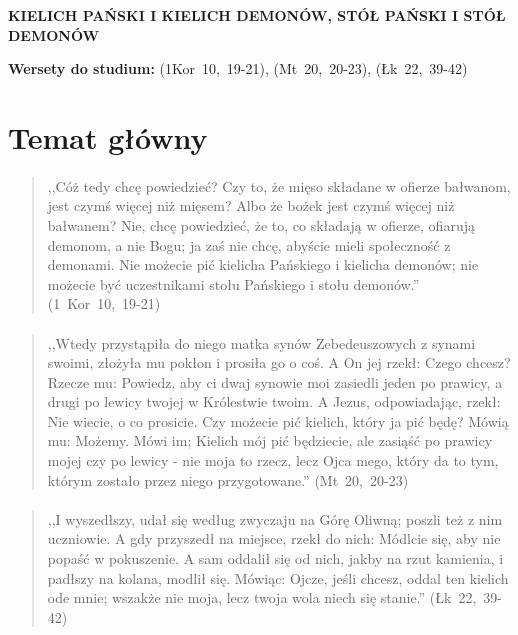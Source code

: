 \documentclass[10pt,a4paper,oneside]{article}
\begin{document}
\centerline{\textbf{\MakeUppercase{Kielich Pański i kielich demonów, stół Pański i stół demonów}}}
\begin{center}
\textbf{Wersety do studium:} 
\mbox{(1Kor 10, 19-21)}, \mbox{(Mt 20, 20-23)}, \mbox{(Łk 22, 39-42)}
\end{center}
\section{Temat główny}
\paragraph{}
\begin{quote}
,,Cóż tedy chcę powiedzieć? Czy to, że mięso składane w ofierze bałwanom, jest czymś więcej niż mięsem? Albo że bożek jest czymś więcej niż bałwanem? Nie, chcę powiedzieć, że to, co składają w ofierze, ofiarują demonom, a nie Bogu; ja zaś nie chcę, abyście mieli społeczność z demonami. Nie możecie pić kielicha Pańskiego i kielicha demonów; nie możecie być uczestnikami stołu Pańskiego i stołu demonów.'' \mbox{(1 Kor 10, 19-21)}
\end{quote}
\paragraph{}
\begin{quote}
,,Wtedy przystąpiła do niego matka synów Zebedeuszowych z synami swoimi, złożyła mu pokłon i prosiła go o coś. A On jej rzekł: Czego chcesz? Rzecze mu: Powiedz, aby ci dwaj synowie moi zasiedli jeden po prawicy, a drugi po lewicy twojej w Królestwie twoim. A Jezus, odpowiadając, rzekł: Nie wiecie, o co prosicie. Czy możecie pić kielich, który ja pić będę? Mówią mu: Możemy. Mówi im; Kielich mój pić będziecie, ale zasiąść po prawicy mojej czy po lewicy - nie moja to rzecz, lecz Ojca mego, który da to tym, którym zostało przez niego przygotowane.'' \mbox{(Mt 20, 20-23)}
\end{quote}
\paragraph{}
\begin{quote}
,,I wyszedłszy, udał się według zwyczaju na Górę Oliwną; poszli też z nim uczniowie. A gdy przyszedł na miejsce, rzekł do nich: Módlcie się, aby nie popaść w pokuszenie. A sam oddalił się od nich, jakby na rzut kamienia, i padłszy na kolana, modlił się. Mówiąc: Ojcze, jeśli chcesz, oddal ten kielich ode mnie; wszakże nie moja, lecz twoja wola niech się stanie.'' \mbox{(Łk 22, 39-42)}
\end{quote}
\end{document}
